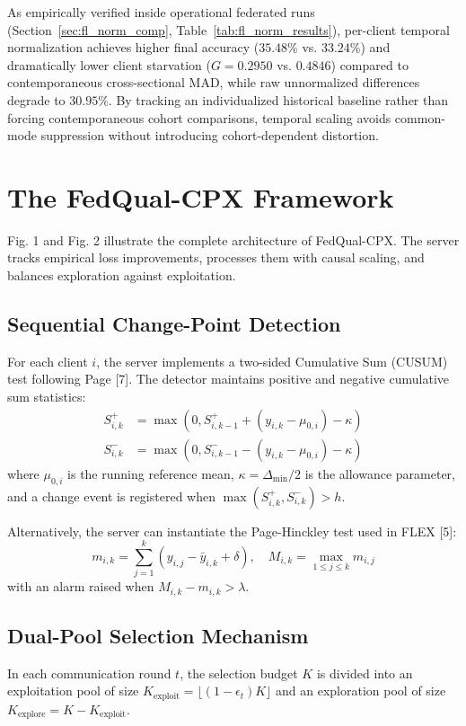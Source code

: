 \documentclass[conference]{IEEEtran}
\begin{document}
As empirically verified inside operational federated runs (Section~\ref{sec:fl_norm_comp}, Table~\ref{tab:fl_norm_results}), per-client temporal normalization achieves higher final accuracy ($35.48\%$ vs. $33.24\%$) and dramatically lower client starvation ($G = 0.2950$ vs. $0.4846$) compared to contemporaneous cross-sectional MAD, while raw unnormalized differences degrade to $30.95\%$. By tracking an individualized historical baseline rather than forcing contemporaneous cohort comparisons, temporal scaling avoids common-mode suppression without introducing cohort-dependent distortion.

\section{The FedQual-CPX Framework}
Fig. 1 and Fig. 2 illustrate the complete architecture of FedQual-CPX. The server tracks empirical loss improvements, processes them with causal scaling, and balances exploration against exploitation.

\subsection{Sequential Change-Point Detection}
For each client $i$, the server implements a two-sided Cumulative Sum (CUSUM) test following Page [7]. The detector maintains positive and negative cumulative sum statistics:
\begin{align}
S_{i,k}^+ &= \max\left(0, S_{i,k-1}^+ + (y_{i,k} - \mu_{0,i}) - \kappa\right) \\
S_{i,k}^- &= \max\left(0, S_{i,k-1}^- - (y_{i,k} - \mu_{0,i}) - \kappa\right)
\end{align}
where $\mu_{0,i}$ is the running reference mean, $\kappa = \Delta_{\min}/2$ is the allowance parameter, and a change event is registered when $\max(S_{i,k}^+, S_{i,k}^-) > h$.

Alternatively, the server can instantiate the Page-Hinckley test used in FLEX [5]:
\begin{equation}
m_{i,k} = \sum_{j=1}^k (y_{i,j} - \bar{y}_{i,k} + \delta), \quad M_{i,k} = \max_{1 \le j \le k} m_{i,j}
\end{equation}
with an alarm raised when $M_{i,k} - m_{i,k} > \lambda$.

\subsection{Dual-Pool Selection Mechanism}
In each communication round $t$, the selection budget $K$ is divided into an exploitation pool of size $K_{\text{exploit}} = \lfloor (1 - \epsilon_t) K \rfloor$ and an exploration pool of size $K_{\text{explore}} = K - K_{\text{exploit}}$.
\end{document}
